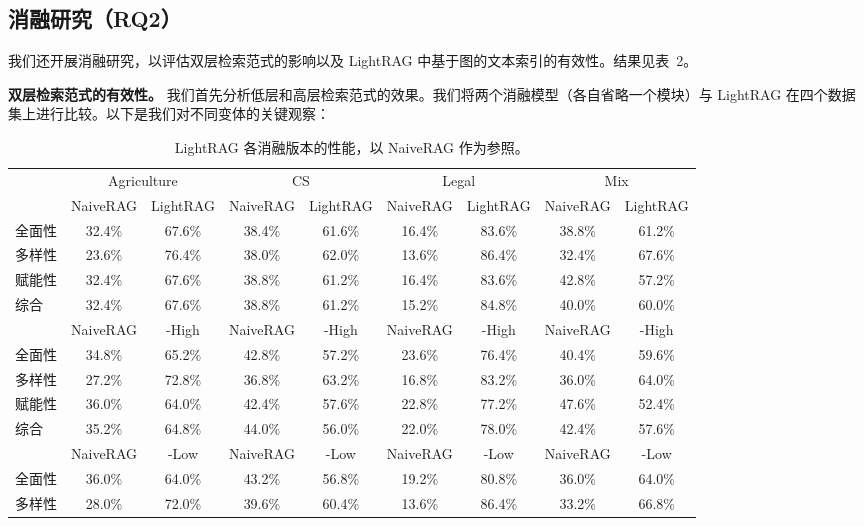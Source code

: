 \documentclass[11pt,UTF8,fontset=fandol]{ctexart}
\begin{document}
\subsection{消融研究（RQ2）}

我们还开展消融研究，以评估双层检索范式的影响以及 LightRAG 中基于图的文本索引的有效性。结果见表~2。

\textbf{双层检索范式的有效性。} 我们首先分析低层和高层检索范式的效果。我们将两个消融模型（各自省略一个模块）与 LightRAG 在四个数据集上进行比较。以下是我们对不同变体的关键观察：

\begin{table}[H]\centering
\caption{LightRAG 各消融版本的性能，以 NaiveRAG 作为参照。}
\label{tab:2}
\small
\setlength{\tabcolsep}{4pt}
\begin{tabular}{lcccccccc}
\toprule
& \multicolumn{2}{c}{Agriculture} & \multicolumn{2}{c}{CS} & \multicolumn{2}{c}{Legal} & \multicolumn{2}{c}{Mix} \\
\cmidrule(lr){2-3}\cmidrule(lr){4-5}\cmidrule(lr){6-7}\cmidrule(lr){8-9}
& NaiveRAG & LightRAG & NaiveRAG & LightRAG & NaiveRAG & LightRAG & NaiveRAG & LightRAG \\
\midrule
全面性 & 32.4\% & 67.6\% & 38.4\% & 61.6\% & 16.4\% & 83.6\% & 38.8\% & 61.2\% \\
多样性 & 23.6\% & 76.4\% & 38.0\% & 62.0\% & 13.6\% & 86.4\% & 32.4\% & 67.6\% \\
赋能性 & 32.4\% & 67.6\% & 38.8\% & 61.2\% & 16.4\% & 83.6\% & 42.8\% & 57.2\% \\
综合 & 32.4\% & 67.6\% & 38.8\% & 61.2\% & 15.2\% & 84.8\% & 40.0\% & 60.0\% \\
\midrule
& NaiveRAG & -High & NaiveRAG & -High & NaiveRAG & -High & NaiveRAG & -High \\
\midrule
全面性 & 34.8\% & 65.2\% & 42.8\% & 57.2\% & 23.6\% & 76.4\% & 40.4\% & 59.6\% \\
多样性 & 27.2\% & 72.8\% & 36.8\% & 63.2\% & 16.8\% & 83.2\% & 36.0\% & 64.0\% \\
赋能性 & 36.0\% & 64.0\% & 42.4\% & 57.6\% & 22.8\% & 77.2\% & 47.6\% & 52.4\% \\
综合 & 35.2\% & 64.8\% & 44.0\% & 56.0\% & 22.0\% & 78.0\% & 42.4\% & 57.6\% \\
\midrule
& NaiveRAG & -Low & NaiveRAG & -Low & NaiveRAG & -Low & NaiveRAG & -Low \\
\midrule
全面性 & 36.0\% & 64.0\% & 43.2\% & 56.8\% & 19.2\% & 80.8\% & 36.0\% & 64.0\% \\
多样性 & 28.0\% & 72.0\% & 39.6\% & 60.4\% & 13.6\% & 86.4\% & 33.2\% & 66.8\% \\

\end{tabular}
\end{table}
\end{document}
